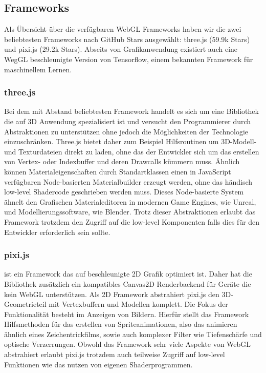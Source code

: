 \subsection{Frameworks}
Als Übersicht über die verfügbaren WebGL Frameworks haben wir die zwei beliebtesten Frameworks nach GitHub Stars ausgewählt: three.js (59.9k Stars) und pixi.js (29.2k Stars). Abseits von Grafikanwendung existiert auch eine WegGL beschleunigte Version von Tensorflow, einem bekannten Framework für maschinellem Lernen.
\subsubsection*{three.js} Bei dem mit Abstand beliebtesten Framework handelt es sich um eine Bibliothek die auf 3D Anwendung spezialisiert ist und versucht den Programmierer durch Abstraktionen zu unterstützen ohne jedoch die Möglichkeiten der Technologie einzuschränken. Three.js bietet daher zum Beispiel Hilfsroutinen um 3D-Modell- und Texturdateien direkt zu laden, ohne das der Entwickler sich um das erstellen von Vertex- oder Indexbuffer und deren Drawcalls kümmern muss. Ähnlich können Materialeigenschaften durch Standartklassen \bzw einen in JavaScript verfügbaren Node-basierten Materialbuilder erzeugt werden, ohne das händisch low-level Shadercode geschrieben werden muss. Dieses Node-basierte System ähnelt den Grafischen Materialeditoren in modernen Game Engines, wie \zb Unreal, und Modellierungssoftware, wie \zb Blender. Trotz dieser Abstraktionen erlaubt das Framework trotzdem den Zugriff auf die low-level Komponenten falls dies für den Entwickler erforderlich sein sollte.
\subsubsection*{pixi.js} ist ein Framework das auf beschleunigte 2D Grafik optimiert ist. Daher hat die Bibliothek zusätzlich ein kompatibles Canvas2D Renderbackend für Geräte die kein WebGL unterstützen. Als 2D Framework abstrahiert pixi.js den 3D-Geometrieteil mit Vertexbuffern und Modellen komplett. Die Fokus der Funktionalität besteht im Anzeigen von Bildern. Hierfür stellt das Framework Hilfsmethoden für das erstellen von Spriteanimationen, also das animieren ähnlich eines Zeichentrickfilms, sowie auch komplexer Filter wie Tiefenschärfe und optische Verzerrungen. Obwohl das Framework sehr viele Aspekte von WebGL abstrahiert erlaubt pixi.js trotzdem auch teilweise Zugriff auf low-level Funktionen wie das nutzen von eigenen Shaderprogrammen.
